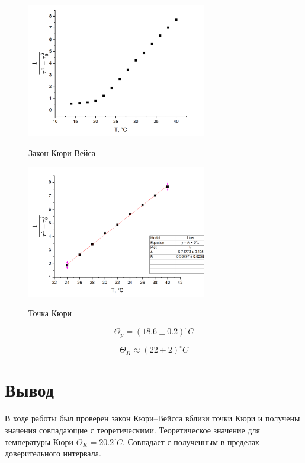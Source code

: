 \documentclass[12pt,a4paper]{article}
\begin{document}
\begin{figure}[h!]
	\begin{center}
		\includegraphics[width = 0.7\textwidth]{full.png}
		\label{fig:facility}
        \caption{Закон Кюри-Вейса}
	\end{center}
\end{figure}

\begin{figure}[h!]
	\begin{center}
		\includegraphics[width = 0.7\textwidth]{line.png}
		\label{fig:facility}
        \caption{Точка Кюри}
	\end{center}
\end{figure}

\[
	\Theta_p = (18.6 \pm 0.2)^\circ C
\]

\[
	\Theta_K \approx (22 \pm 2) ^\circ C
\]
\section{Вывод}

В ходе работы был проверен закон Кюри–Вейсса вблизи точки Кюри и получены значения совпадающие с теоретическими.
Теоретическое значение для температуры Кюри $\Theta_K = 20.2 ^\circ C$. Совпадает с полученным в пределах доверительного интервала.
\end{document}

